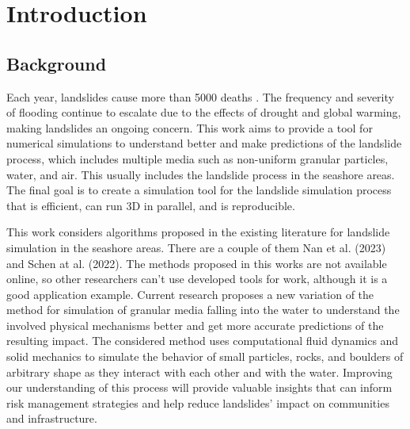 \chapter{Introduction} \label{chap:intro}

\section{Background}

Each year, landslides cause more than 5000 deaths \cite{perkins2012death}. The frequency and severity of flooding continue to escalate due to the effects of drought and global warming, making landslides an ongoing concern. This work aims to provide a tool for numerical simulations to understand better and make predictions of the landslide process, which includes multiple media such as non-uniform granular particles, water, and air. This usually includes the landslide process in the seashore areas. The final goal is to create a simulation tool for the landslide simulation process that is efficient, can run 3D in parallel, and is reproducible. 

This work considers algorithms proposed in the existing literature for landslide simulation in the seashore areas. There are a couple of them Nan et al. (2023)\cite{nan2023high} and Schen at al. (2022)\cite{shen2022resolved}. The methods proposed in this works are not available online, so other researchers can't use developed tools for work, although it is a good application example. Current research proposes a new variation of the method for simulation of granular media falling into the water to understand the involved physical mechanisms better and get more accurate predictions of the resulting impact. The considered method uses computational fluid dynamics and solid mechanics to simulate the behavior of small particles, rocks, and boulders of arbitrary shape as they interact with each other and with the water. Improving our understanding of this process will provide valuable insights that can inform risk management strategies and help reduce landslides' impact on communities and infrastructure.

